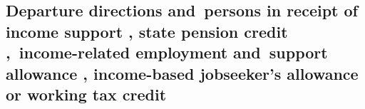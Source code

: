 \documentclass[12pt,a4paper]{article}
\begin{document}
%
%
%

\subsection[9. Departure directions and~persons in receipt of income support%
, state pension credit%
,~income-related employment and~support allowance%
, income-based jobseeker’s allowance
or working tax credit%
]{Departure directions and~persons in receipt of income support%
, state pension credit%
,~income-related employment and~support allowance%
, income-based jobseeker’s allowance
or working tax credit%
}
\end{document}
